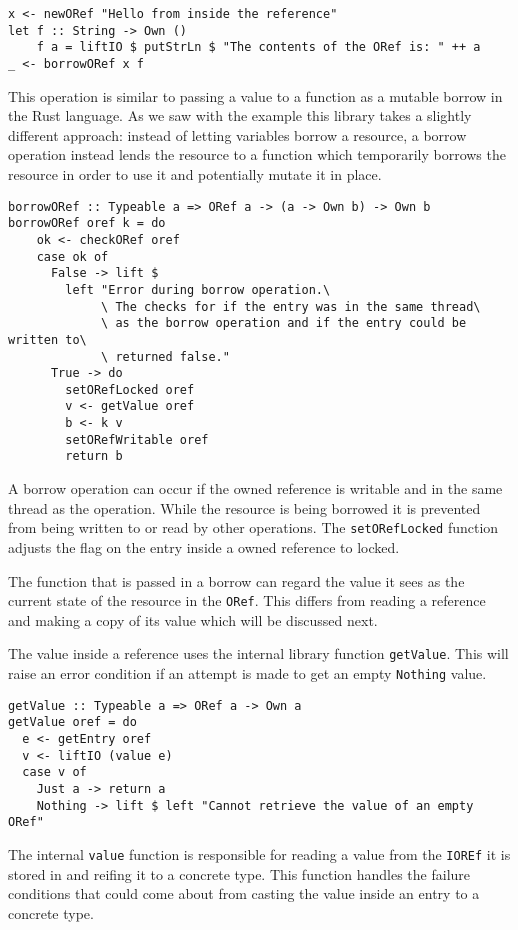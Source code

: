 \documentclass[onehalf,11pt]{beavtex}
\begin{document}
\begin{verbatim}
x <- newORef "Hello from inside the reference"
let f :: String -> Own ()
    f a = liftIO $ putStrLn $ "The contents of the ORef is: " ++ a
_ <- borrowORef x f
\end{verbatim}

This operation is similar to passing a value to a function as a mutable
borrow in the Rust language.
As we saw with the example this library takes a slightly different approach:
instead of letting variables borrow a resource, a borrow operation instead lends
the resource to a function which temporarily borrows the resource in order to
use it and potentially mutate it in place.

\begin{verbatim}
borrowORef :: Typeable a => ORef a -> (a -> Own b) -> Own b
borrowORef oref k = do
    ok <- checkORef oref
    case ok of
      False -> lift $
        left "Error during borrow operation.\
             \ The checks for if the entry was in the same thread\
             \ as the borrow operation and if the entry could be written to\
             \ returned false."
      True -> do
        setORefLocked oref
        v <- getValue oref
        b <- k v
        setORefWritable oref
        return b
\end{verbatim}

A borrow operation can occur if the owned reference is writable and
in the same thread as the operation.
While the resource is being borrowed it is prevented from being written to or
read by other operations. The \texttt{setORefLocked} function adjusts the flag
on the entry inside a owned reference to locked.

The function that is passed in a borrow can regard the value it sees as the
current state of the resource in the \texttt{ORef}. This differs from reading a
reference and making a copy of its value which will be discussed next.

The value inside a reference uses the internal library function
\texttt{getValue}. This will raise an error condition if an
attempt is made to get an empty \texttt{Nothing} value.

\begin{verbatim}
getValue :: Typeable a => ORef a -> Own a
getValue oref = do
  e <- getEntry oref
  v <- liftIO (value e)
  case v of
    Just a -> return a
    Nothing -> lift $ left "Cannot retrieve the value of an empty ORef"
\end{verbatim}

The internal \texttt{value} function is responsible for reading a value from
the \texttt{IOREf} it is stored in and reifing it to a concrete type.
This function handles the failure conditions that could come
about from casting the value inside an entry to a concrete type.
\end{document}
